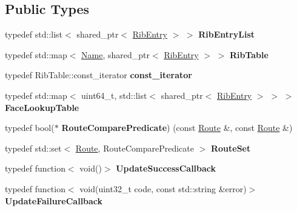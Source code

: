 \subsection*{Public Types}
\begin{DoxyCompactItemize}
\item 
typedef std\+::list$<$ shared\+\_\+ptr$<$ \hyperlink{classnfd_1_1rib_1_1RibEntry}{Rib\+Entry} $>$ $>$ {\bfseries Rib\+Entry\+List}\hypertarget{classnfd_1_1rib_1_1Rib_a5fcdc337eb7937bbe8f8b3db0b92a926}{}\label{classnfd_1_1rib_1_1Rib_a5fcdc337eb7937bbe8f8b3db0b92a926}

\item 
typedef std\+::map$<$ \hyperlink{classndn_1_1Name}{Name}, shared\+\_\+ptr$<$ \hyperlink{classnfd_1_1rib_1_1RibEntry}{Rib\+Entry} $>$ $>$ {\bfseries Rib\+Table}\hypertarget{classnfd_1_1rib_1_1Rib_a739da39e96a0b1bcbbb3e5c220d39256}{}\label{classnfd_1_1rib_1_1Rib_a739da39e96a0b1bcbbb3e5c220d39256}

\item 
typedef Rib\+Table\+::const\+\_\+iterator {\bfseries const\+\_\+iterator}\hypertarget{classnfd_1_1rib_1_1Rib_aa2c6ea85098c6f867addddf969aeca47}{}\label{classnfd_1_1rib_1_1Rib_aa2c6ea85098c6f867addddf969aeca47}

\item 
typedef std\+::map$<$ uint64\+\_\+t, std\+::list$<$ shared\+\_\+ptr$<$ \hyperlink{classnfd_1_1rib_1_1RibEntry}{Rib\+Entry} $>$ $>$ $>$ {\bfseries Face\+Lookup\+Table}\hypertarget{classnfd_1_1rib_1_1Rib_a500050fce207ee037b842ab2d189f2b0}{}\label{classnfd_1_1rib_1_1Rib_a500050fce207ee037b842ab2d189f2b0}

\item 
typedef bool($\ast$ {\bfseries Route\+Compare\+Predicate}) (const \hyperlink{classnfd_1_1rib_1_1Route}{Route} \&, const \hyperlink{classnfd_1_1rib_1_1Route}{Route} \&)\hypertarget{classnfd_1_1rib_1_1Rib_ab077be972e35174988d851c69f927b54}{}\label{classnfd_1_1rib_1_1Rib_ab077be972e35174988d851c69f927b54}

\item 
typedef std\+::set$<$ \hyperlink{classnfd_1_1rib_1_1Route}{Route}, Route\+Compare\+Predicate $>$ {\bfseries Route\+Set}\hypertarget{classnfd_1_1rib_1_1Rib_a5e841b06200417b115c972eb81fcf9b2}{}\label{classnfd_1_1rib_1_1Rib_a5e841b06200417b115c972eb81fcf9b2}

\item 
typedef function$<$ void()$>$ {\bfseries Update\+Success\+Callback}\hypertarget{classnfd_1_1rib_1_1Rib_ade7af23c4f09754473b15047ff140607}{}\label{classnfd_1_1rib_1_1Rib_ade7af23c4f09754473b15047ff140607}

\item 
typedef function$<$ void(uint32\+\_\+t code, const std\+::string \&error)$>$ {\bfseries Update\+Failure\+Callback}\hypertarget{classnfd_1_1rib_1_1Rib_a9d6fd8cbf4a7ccb12e67f817134f88f4}{}\label{classnfd_1_1rib_1_1Rib_a9d6fd8cbf4a7ccb12e67f817134f88f4}

\end{DoxyCompactItemize}
